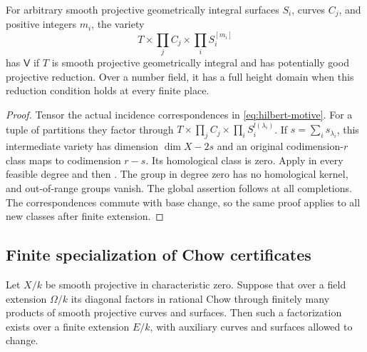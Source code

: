 \begin{theorem}\label{thm:hilbert}
For arbitrary smooth projective geometrically integral surfaces
$S_i$, curves $C_j$, and
positive integers $m_i$, the variety
\[
 T\times\prod_j C_j\times\prod_i S_i^{[m_i]}
\]
has $\mathsf V$ if $T$ is smooth projective geometrically integral
and has potentially good projective reduction.
Over a number field, it has a full height domain when this reduction
condition holds at every finite place.
\end{theorem}

\begin{proof}
Tensor the actual incidence correspondences in
\eqref{eq:hilbert-motive}. For a tuple of partitions they factor
through $T\times\prod_j C_j\times\prod_i S_i^{l(\lambda_i)}$.
If $s=\sum_i s_{\lambda_i}$, this intermediate variety has
dimension $\dim X-2s$ and an original codimension-$r$ class maps
to codimension $r-s$. Its homological class is zero. Apply
 in every feasible degree and then
. The group in degree zero has no
homological kernel, and out-of-range groups vanish. The global
assertion follows at all completions. The correspondences commute
with base change, so the same proof applies to all new classes
after finite extension.
\end{proof}

\subsection{Finite specialization of Chow certificates}

\begin{lemma}\label{lem:specialize-certificate}
Let $X/k$ be smooth projective in characteristic zero. Suppose that
over a field extension $\Omega/k$ its diagonal factors in rational
Chow through finitely many products of smooth projective curves and
surfaces. Then such a factorization exists over a finite extension
$E/k$, with auxiliary curves and surfaces allowed to change.
\end{lemma}

